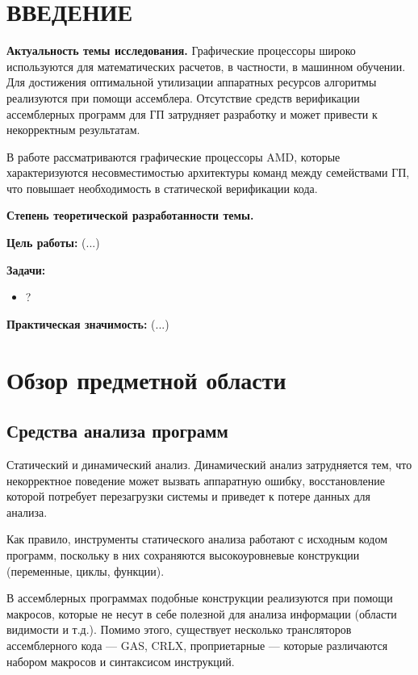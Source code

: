 \documentclass[a4paper,14pt]{extarticle}
\begin{document}
\tableofcontents
\newpage

\section*{ВВЕДЕНИЕ}

\textbf{Актуальность темы исследования.} Графические процессоры широко используются для
математических расчетов, в частности, в машинном обучении. Для достижения оптимальной
утилизации аппаратных ресурсов алгоритмы реализуются при помощи ассемблера. Отсутствие
средств верификации ассемблерных программ для ГП затрудняет разработку и
может привести к некорректным результатам.

В работе рассматриваются графические процессоры AMD, которые характеризуются несовместимостью
архитектуры команд между семействами ГП, что повышает необходимость в статической
верификации кода.\newline

\textbf{Степень теоретической разработанности темы.} 

\textbf{Цель работы:} (...)

\textbf{Задачи:}
\begin{itemize}
\item ?
\end{itemize}

\textbf{Практическая значимость:} (...)

\section{Обзор предметной области}

\subsection{Средства анализа программ}

Статический и динамический анализ. Динамический анализ затрудняется тем, что некорректное
поведение может вызвать аппаратную ошибку, восстановление которой потребует перезагрузки
системы и приведет к потере данных для анализа.  %

Как правило, инструменты статического анализа работают с исходным кодом программ,
поскольку в них сохраняются высокоуровневые конструкции (переменные, циклы, функции).

В ассемблерных программах подобные конструкции реализуются при помощи макросов,
которые не несут в себе полезной для анализа информации (области видимости и т.д.).
Помимо этого, существует несколько трансляторов ассемблерного кода — GAS, CRLX, проприетарные — которые
различаются набором макросов и синтаксисом инструкций.
\end{document}
